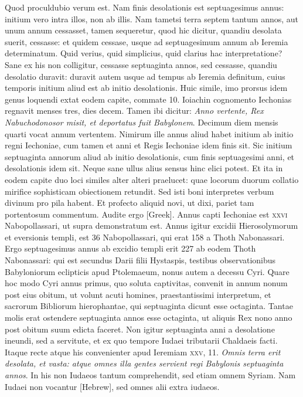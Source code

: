 Quod
proculdubio verum est.
Nam finis desolationis est septuagesimus
annus: initium vero intra illos, non ab illis.
Nam tametsi terra septem
tantum annos, aut unum annum cessasset, tamen sequeretur,
quod hic dicitur, quandiu desolata suerit, cessasse: et quidem cessase,
usque ad septuagesimum annum ab Ieremia determinatum.
Quid verius, quid simplicius, quid clarius hac interpretatione?
Sane
ex his non colligitur, cessasse septuaginta annos, sed cessasse,
quandiu desolatio duravit: duravit autem usque ad tempus ab Ieremia
definitum, cuius temporis initium aliud est ab initio desolationis.
Huic simile, imo prorsus idem genus loquendi extat eodem capite,
commate 10.
Ioiachin cognomento Iechonias regnavit menses tres,
dies decem.
Tamen ibi dicitur: \textit{Anno vertente, Rex Nabuchodonosor
misit, et deportatus fuit Babylonem}.
Decimum diem mensis quarti
vocat annum vertentem.
Nimirum ille annus aliud habet initium
ab initio regni Iechoniae, cum tamen et anni et Regis Iechoniae
idem finis sit.
Sic initium septuaginta annorum aliud ab initio desolationis,
cum finis septuagesimi anni, et desolationis idem sit.
Neque sane ullus alius sensus hinc elici potest.
Et ita in eodem capite
duo loci similes alter alteri praelucet: quae locorum duorum
collatio mirifice sophisticam obiectionem retundit.
Sed isti boni
interpretes verbum divinum pro pila habent.
Et profecto aliquid
novi, ut dixi, pariet tam portentosum commentum.
Audite
ergo \textgreek{[Greek]}.
Annus capti Iechoniae est \textsc{xxvi} Nabopollassari,
ut supra demonstratum est.
Annus igitur excidii Hierosolymorum
et eversionis templi, est 36 Nabopollassari, qui erat 158 a
Thoth Nabonassari.
Ergo septuagesimus annus ab excidio templi
erit 227 ab eodem Thoth Nabonassari: qui est secundus Darii filii
Hystaspis, testibus observationibus Babyloniorum eclipticis apud
Ptolemaeum, nonus autem a decessu Cyri.
Quare hoc modo
Cyri annus primus, quo soluta captivitas, convenit in annum
nonum post eius obitum, ut volunt acuti homines, praestantissimi
interpretum, et sacrorum Bibliorum hierophantae, qui septuaginta
dicunt esse octaginta.
Tantae molis erat ostendere septuaginta
annos esse octaginta, ut aliquis Rex nono anno post obitum
suum edicta faceret.
Non igitur septuaginta anni a desolatione
ineundi, sed a servitute, et ex quo tempore Iudaei tributarii
Chaldaeis facti.
Itaque recte atque his convenienter apud Ieremiam
\textsc{xxv}, 11.
\textit{Omnis terra erit desolata, et vasta: atque omnes
illa gentes servient regi Babylonis septuaginta annos}.
In his non Iudaeos
tantum comprehendit, sed etiam omnem Syriam.
Nam Iudaei
non vocantur \texthebrew{[Hebrew]}, sed omnes alii extra iudaeos.

